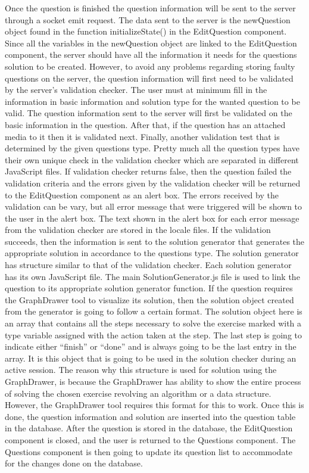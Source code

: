 Once the question is finished the question information will be sent to the server through a socket emit request. The data sent to the server is the newQuestion object found in the function initializeState() in the EditQuestion component. Since all the variables in the newQuestion object are linked to the EditQuestion component, the server should have all the information it needs for the questions solution to be created. However, to avoid any problems regarding storing faulty questions on the server, the question information will first need to be validated by the server's validation checker. The user must at minimum fill in the information in basic information and solution type for the wanted question to be valid. The question information sent to the server will first be validated on the basic information in the question. After that, if the question has an attached media to it then it is validated next. Finally, another validation test that is determined by the given questions type. Pretty much all the question types have their own unique check in the validation checker which are separated in different JavaScript files. If validation checker returns false, then the question failed the validation criteria and the errors given by the validation checker will be returned to the EditQuestion component as an alert box. The errors received by the validation can be vary, but all error message that were triggered will be shown to the user in the alert box. The text shown in the alert box for each error message from the validation checker are stored in the locale files. If the validation succeeds, then the information is sent to the solution generator that generates the appropriate solution in accordance to the questions type. The solution generator has structure similar to that of the validation checker. Each solution generator has its own JavaScript file. The main SolutionGenerator.js file is used to link the question to its appropriate solution generator function. If the question requires the GraphDrawer tool to visualize its solution, then the solution object created from the generator is going to follow a certain format. The solution object here is   an array that contains all the steps necessary to solve the exercise marked with a type variable assigned with the action taken at the step. The last step is going to indicate either “finish” or “done” and is always going to be the last entry in the array. It is this object that is going to be used in the solution checker during an active session. The reason why this structure is used for solution using the GraphDrawer, is because the GraphDrawer has ability to show the entire process of solving the chosen exercise revolving an algorithm or a data structure. However, the GraphDrawer tool requires this format for this to work.  Once this is done, the question information and solution are inserted into the question table in the database. After the question is stored in the database, the EditQuestion component is closed, and the user is returned to the Questions component. The Questions component is then going to update its question list to accommodate for the changes done on the database.
